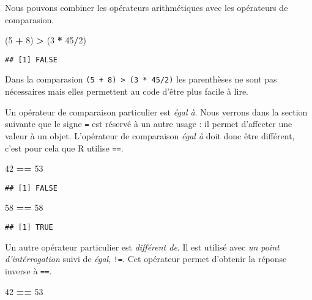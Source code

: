 \documentclass[]{book}
\newenvironment{Shaded}{\begin{snugshade}}{\end{snugshade}}
\newcommand{\DecValTok}[1]{\textcolor[rgb]{0.00,0.00,0.81}{#1}}
\newcommand{\StringTok}[1]{\textcolor[rgb]{0.31,0.60,0.02}{#1}}
\newcommand{\OperatorTok}[1]{\textcolor[rgb]{0.81,0.36,0.00}{\textbf{#1}}}
\newcommand{\NormalTok}[1]{#1}
\theoremstyle{definition}
\theoremstyle{definition}
\theoremstyle{definition}
\theoremstyle{remark}
\begin{document}
Nous pouvons combiner les opérateurs arithmétiques avec les opérateurs
de comparasion.

\begin{Shaded}
\begin{Highlighting}[]
\NormalTok{(}\DecValTok{5} \OperatorTok{+}\StringTok{ }\DecValTok{8}\NormalTok{) }\OperatorTok{>}\StringTok{ }\NormalTok{(}\DecValTok{3} \OperatorTok{*}\StringTok{ }\DecValTok{45}\OperatorTok{/}\DecValTok{2}\NormalTok{) }
\end{Highlighting}
\end{Shaded}

\begin{verbatim}
## [1] FALSE
\end{verbatim}

Dans la comparasion \texttt{(5\ +\ 8)\ \textgreater{}\ (3\ *\ 45/2)} les
parenthèses ne sont pas nécessaires mais elles permettent au code d'être
plus facile à lire.

Un opérateur de comparaison particulier est \emph{égal à}. Nous verrons
dans la section suivante que le signe \texttt{=} est réservé à un autre
usage : il permet d'affecter une valeur à un objet. L'opérateur de
comparaison \emph{égal à} doit donc être différent, c'est pour cela que
R utilise \texttt{==}.

\begin{Shaded}
\begin{Highlighting}[]
\DecValTok{42} \OperatorTok{==}\StringTok{ }\DecValTok{53}
\end{Highlighting}
\end{Shaded}

\begin{verbatim}
## [1] FALSE
\end{verbatim}

\begin{Shaded}
\begin{Highlighting}[]
\DecValTok{58} \OperatorTok{==}\StringTok{ }\DecValTok{58}
\end{Highlighting}
\end{Shaded}

\begin{verbatim}
## [1] TRUE
\end{verbatim}

Un autre opérateur particulier est \emph{différent de}. Il est utilisé
avec \emph{un point d'intérrogation} suivi de \emph{égal}, \texttt{!=}.
Cet opérateur permet d'obtenir la réponse inverse à \texttt{==}.

\begin{Shaded}
\begin{Highlighting}[]
\DecValTok{42} \OperatorTok{==}\StringTok{ }\DecValTok{53}
\end{Highlighting}
\end{Shaded}
\end{document}
